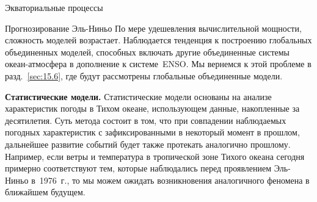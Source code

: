 \begin{chapter}{Экваториальные процессы}
\begin{section}{Прогнозирование Эль-Ниньо}
По мере удешевления вычислительной мощности, сложность моделей возрастает.
Наблюдается тенденция к построению глобальных объединенных моделей, способных
включать другие объединенные системы океан-атмосфера в дополнение к 
системе~ENSO. 
Мы вернемся к этой проблеме в разд.~\ref{sec:15.6}, где будут
рассмотрены глобальные объединенные модели.
%

\textbf{Статистические модели.} Статистические модели основаны на
анализе характеристик погоды в Тихом океане, использующем данные, накопленные
за десятилетия. Суть метода состоит в том, что при совпадении наблюдаемых
погодных характеристик с зафиксированными в некоторый момент в прошлом,
дальнейшее развитие событий будет также протекать аналогично прошлому.
Например, если ветры и температура в тропической зоне Тихого океана сегодня
примерно соответствуют тем, которые наблюдались перед проявлением Эль-Ниньо
в~1976~г., то мы можем ожидать возникновения аналогичного феномена в 
ближайшем будущем.
%


\end{section}
\end{chapter}
